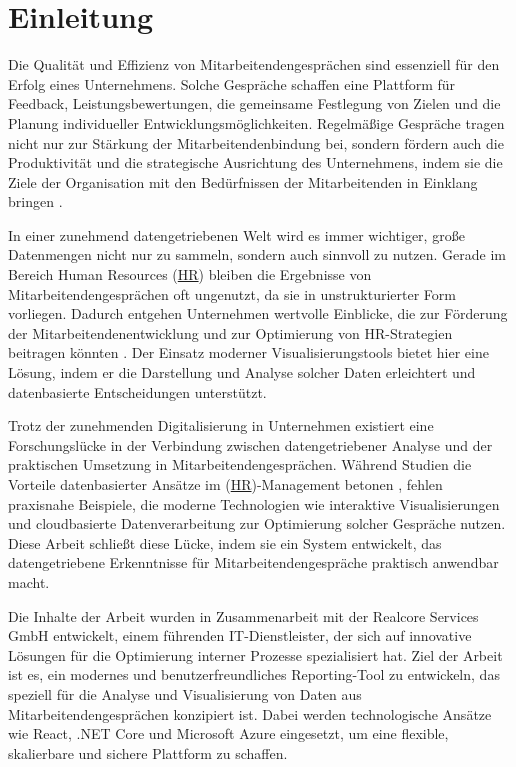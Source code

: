 \chapter{Einleitung} \label{chap:einleitung}

Die Qualität und Effizienz von Mitarbeitendengesprächen sind essenziell für den Erfolg eines Unternehmens. Solche Gespräche schaffen eine Plattform für Feedback, Leistungsbewertungen, die gemeinsame Festlegung von Zielen und die Planung individueller Entwicklungsmöglichkeiten. Regelmäßige  Gespräche tragen nicht nur zur Stärkung der Mitarbeitendenbindung bei, sondern fördern auch die Produktivität und die strategische Ausrichtung des Unternehmens, indem sie die Ziele der Organisation mit den Bedürfnissen der Mitarbeitenden in Einklang bringen \cite{Schober2008, Bryson2011}.

In einer zunehmend datengetriebenen Welt wird es immer wichtiger, große Datenmengen nicht nur zu sammeln, sondern auch sinnvoll zu nutzen. Gerade im Bereich Human Resources (\hyperref[abkuerzungen]{HR}) bleiben die Ergebnisse von Mitarbeitendengesprächen oft ungenutzt, da sie in unstrukturierter Form vorliegen. Dadurch entgehen Unternehmen wertvolle Einblicke, die zur Förderung der Mitarbeitendenentwicklung und zur Optimierung von HR-Strategien beitragen könnten \cite{Kirk2016}. Der Einsatz moderner Visualisierungstools bietet hier eine Lösung, indem er die Darstellung und Analyse solcher Daten erleichtert und datenbasierte Entscheidungen unterstützt.

Trotz der zunehmenden Digitalisierung in Unternehmen existiert eine Forschungslücke in der Verbindung zwischen datengetriebener Analyse und der praktischen Umsetzung in Mitarbeitendengesprächen. Während Studien die Vorteile datenbasierter Ansätze im (\hyperref[abkuerzungen]{HR})-Management betonen \cite{Evergreen2016}, fehlen praxisnahe Beispiele, die moderne Technologien wie interaktive Visualisierungen und cloudbasierte Datenverarbeitung zur Optimierung solcher Gespräche nutzen. Diese Arbeit schließt diese Lücke, indem sie ein System entwickelt, das datengetriebene Erkenntnisse für Mitarbeitendengespräche praktisch anwendbar macht.

Die Inhalte der Arbeit wurden in Zusammenarbeit mit der Realcore Services GmbH entwickelt, einem führenden IT-Dienstleister, der sich auf innovative Lösungen für die Optimierung interner Prozesse spezialisiert hat. Ziel der Arbeit ist es, ein modernes und benutzerfreundliches Reporting-Tool zu entwickeln, das speziell für die Analyse und Visualisierung von Daten aus Mitarbeitendengesprächen konzipiert ist. Dabei werden technologische Ansätze wie React, .NET Core und Microsoft Azure eingesetzt, um eine flexible, skalierbare und sichere Plattform zu schaffen.

